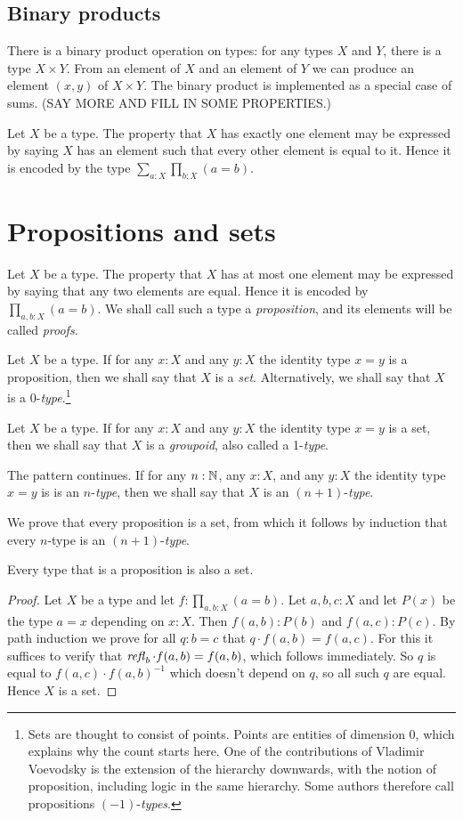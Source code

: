 \subsection{Binary products}
\label{sec:binprod-types}
There is a binary product operation on types: for any types $X$ and $Y$, there is a type $X \times Y$.  From an element of $X$ and an element of
$Y$ we can produce an element $(x,y)$ of $X \times Y$.  The binary product is implemented as a special case of sums.  (SAY MORE AND FILL IN SOME
PROPERTIES.)

Let $X$ be a type.  The property that $X$ has exactly one element may be expressed by saying $X$ has an element such that every other element is
equal to it.  Hence it is encoded by the type $\sum_{a:X} \prod_{b:X} (a=b)$.

\section{Propositions and sets}
\label{sec:propositions-and-sets}

Let $X$ be a type.  The property that $X$ has at most one element may be expressed by saying that any two elements are equal. Hence it is encoded
by $\prod_{a,b:X} (a=b)$.  We shall call such a type a \emph{proposition}, and its elements will be called \emph{proofs}.

Let $X$ be a type.  If for any $x:X$ and any $y:X$ the identity type $x=y$ is a proposition, then we shall say that $X$ is a \emph{set}.
Alternatively, we shall say that $X$ is a 0-\emph{type}.\footnote{%
Sets are thought to consist of points. Points are entities of dimension 0, 
which explains why the count starts here.
One of the contributions of Vladimir Voevodsky is the extension of
the hierarchy downwards, with the notion of proposition,
including logic in the same hierarchy.
Some authors therefore call propositions $(-1)$-\emph{types}.} 

Let $X$ be a type.  If for any $x:X$ and any $y:X$ the identity type $x=y$ is a set, 
 then we shall say that $X$ is a \emph{groupoid}, also called a 1-\emph{type}.

The pattern continues.  If for any $n:\mathbb{N}$, any $x:X$, and any $y:X$ 
the identity type $x=y$ is is an $n$-\emph{type}, 
then we shall say that $X$ is an $(n+1)$-\emph{type}.

We prove that every proposition is a set, from which it follows
by induction that every $n$-type is an $(n+1)$-\emph{type}.

\begin{lemma}\label{lem:prop-is-set}
Every type that is a proposition is also a set.
\end{lemma}
\begin{proof}
Let $X$ be a type and let $f: \prod_{a,b:X} (a=b)$. Let $a,b,c : X$ and
let $P(x)$ be the type $a=x$ depending on $x:X$. Then
$f(a,b):P(b)$ and $f(a,c):P(c)$. By path induction we prove for
all $q:b=c$ that $q\cdot f(a,b) = f(a,c)$. For this it suffices to
verify that $\mathop{{\it refl}_{b}} \cdot f(a,b) = f(a,b)$, which follows immediately.
So $q$ is equal to $f(a,c)\cdot f(a,b)^{-1}$ which doesn't
depend on $q$, so all such $q$ are equal. Hence $X$ is a set.
\end{proof}

